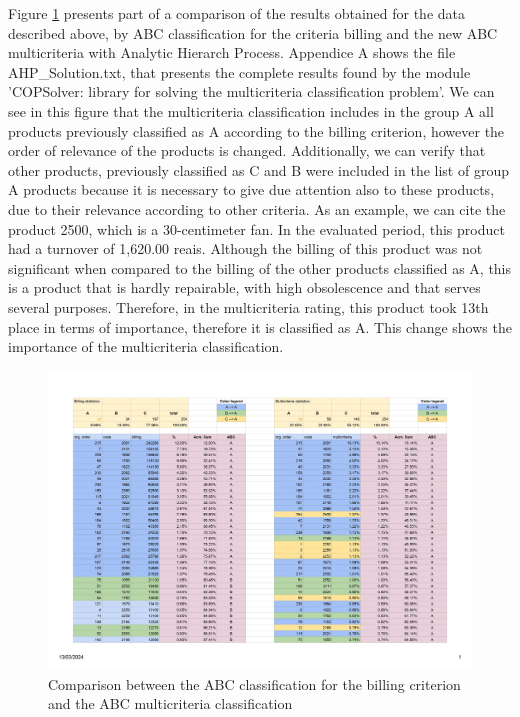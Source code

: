 \documentclass[10pt,fleqn,a4paper,twoside]{article}
\begin{document}
Figure \ref{fig:results} presents part of a comparison of the results obtained for the data described above, by ABC classification for the criteria billing and the new ABC multicriteria with Analytic Hierarch Process. Appendice A shows the file AHP\_Solution.txt, that presents the complete results found by the module 'COPSolver: library for solving the multicriteria classification problem'. We can see in this figure that the multicriteria classification includes in the group A all products previously classified as A according to the billing criterion, however the order of relevance of the products is changed. Additionally, we can verify that other products, previously classified as C and B were included in the list of group A products because it is necessary to give due attention also to these products, due to their relevance according to other criteria. As an example, we can cite the product 2500, which is a 30-centimeter fan. In the evaluated period, this product had a turnover of 1,620.00 reais. Although the billing of this product was not significant when compared to the billing of the other products classified as A, this is a product that is hardly repairable, with high obsolescence and that serves several purposes. Therefore, in the multicriteria rating, this product took 13th place in terms of importance, therefore it is classified as A. This change shows the importance of the multicriteria classification.

\begin{figure}[ht]
	\includegraphics[width=\linewidth]{files/0001.jpg}
  	\caption{Comparison between the ABC classification for the billing criterion and the ABC multicriteria classification}
  	\label{fig:results}
\end{figure} 
\end{document}

